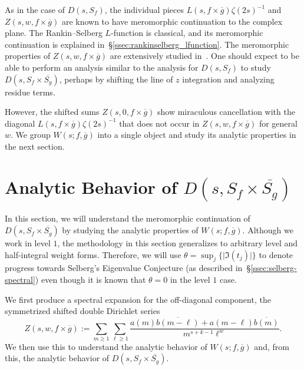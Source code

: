As in the case of $D(s, S_f)$, the individual pieces $L(s, f\times \overline{g})
\zeta(2s)^{-1}$ and $Z(s, w, f\times \overline{g})$ are known to have meromorphic
continuation to the complex plane.
The Rankin--Selberg $L$-function is classical, %
and its meromorphic continuation is explained in~\S\ref{ssec:rankinselberg_lfunction}.
The meromorphic properties of $Z(s,w, f\times \overline{g})$ are extensively studied
in~\cite{HoffsteinHulse13}.
One should expect to be able to perform an analysis similar to the analysis for $D(s,
S_f)$ to study $D(s, S_f \times \overline{S_g})$, perhaps by shifting the line of $z$
integration and analyzing residue terms.


However, the shifted sums $Z(s, 0, f\times \overline{g})$ show miraculous cancellation
with the diagonal $L(s, f\times\overline{g}) \zeta(2s)^{-1}$ that does not occur in $Z(s,
w, f\times \overline{g})$ for general $w$.
We group $W(s; f,\overline{g})$ into a single object and study its analytic properties
in the next section.




\section{Analytic Behavior of $D(s, S_f \times \overline{S_g})$}\label{sec:analyticbehavior}


In this section, we will understand the meromorphic continuation of $D(s, S_f \times
\overline{S_g})$ by studying the analytic properties of $W(s; f, \overline{g})$.
Although we work in level $1$, the methodology in this section generalizes to arbitrary
level and half-integral weight forms.
Therefore, we will use $\theta = \sup_j \{ \lvert \Im(t_j) \rvert \}$ to denote progress
towards Selberg's Eigenvalue Conjecture (as described in~\S\ref{ssec:selberg-spectral})
even though it is known that $\theta = 0$ in the level $1$ case.


We first produce a spectral expansion for the off-diagonal component, the symmetrized
shifted double Dirichlet series
\begin{equation}
  Z(s,w, f\times \overline{g}) := \sum_{m \geq 1} \sum_{\ell \geq 1} \frac{a(m)
  \overline{b(m - \ell)} + a(m - \ell)\overline{b(m)}}{m^{s + k - 1} \ell^w}.
\end{equation}
We then use this to understand the analytic behavior of $W(s; f, \overline{g})$ and, from
this, the analytic behavior of $D(s, S_f \times \overline{S_g})$.




